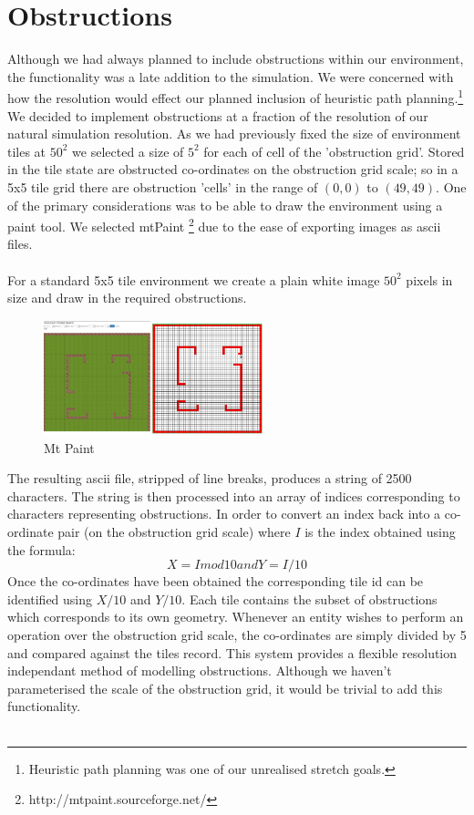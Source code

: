 \documentclass[10pt, a4paper, conference, compsocconf]{IEEEtran}
\begin{document}
\section{Obstructions \label{obstructions}}
Although we had always planned to include obstructions within our environment, the functionality was a late addition to the simulation. We were concerned with how the resolution would effect our planned inclusion of heuristic path planning.\footnote{Heuristic path planning was one of our unrealised stretch goals.} We decided to implement obstructions at a fraction of the resolution of our natural simulation resolution. As we had previously fixed the size of environment tiles at \(50^2\) we selected a size of \(5^2\) for each of cell of the 'obstruction grid'. Stored in the tile state are obstructed co-ordinates on the obstruction grid scale; so in a 5x5 tile grid there are obstruction 'cells' in the range of \( (0,0) \) to \( (49,49) \). One of the primary considerations was to be able to draw the environment using a paint tool. We selected mtPaint \footnote{http://mtpaint.sourceforge.net/} due to the ease of exporting images as ascii files.\\
\\
For a standard 5x5 tile environment we create a plain white image \(50^2\) pixels in size and draw in the required obstructions.

\begin{figure}[h]
  \centering
  \includegraphics[width=2.5in]{../img/mt_paint.png}
\caption{Mt Paint}
    \label{fig:mtpaint}
\end{figure}

The resulting ascii file, stripped of line breaks, produces a string of 2500 characters. The string is then processed into an array of indices corresponding to characters representing obstructions. In order to convert an index back into a co-ordinate pair (on the obstruction grid scale) where \(I\) is the index obtained using the formula: \[X = I mod 10 and Y = I / 10\]
Once the co-ordinates have been obtained the corresponding tile id can be identified using \(X / 10\) and \(Y / 10\). Each tile contains the subset of obstructions which corresponds to its own geometry. Whenever an entity wishes to perform an operation over the obstruction grid scale, the co-ordinates are simply divided by 5 and compared against the tiles record. This system provides a flexible resolution independant method of modelling obstructions. Although we haven't parameterised the scale of the obstruction grid, it would be trivial to add this functionality.\\
\\
\end{document}
